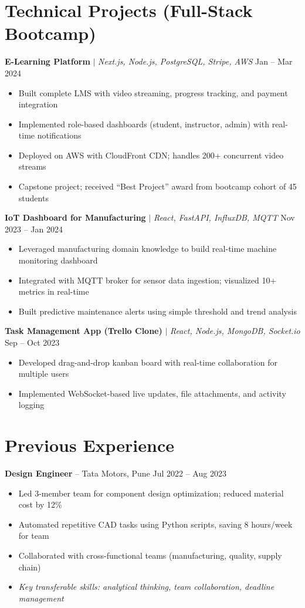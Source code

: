 \documentclass[10.5pt,a4paper]{article}
\begin{document}
\section{Technical Projects (Full-Stack Bootcamp)}
\textbf{\color{accent}E-Learning Platform} $\mid$ \textit{Next.js, Node.js, PostgreSQL, Stripe, AWS} \hfill Jan -- Mar 2024
\begin{itemize}
    \item Built complete LMS with video streaming, progress tracking, and payment integration
    \item Implemented role-based dashboards (student, instructor, admin) with real-time notifications
    \item Deployed on AWS with CloudFront CDN; handles 200+ concurrent video streams
    \item Capstone project; received ``Best Project'' award from bootcamp cohort of 45 students
\end{itemize}

\vspace{4pt}
\textbf{\color{accent}IoT Dashboard for Manufacturing} $\mid$ \textit{React, FastAPI, InfluxDB, MQTT} \hfill Nov 2023 -- Jan 2024
\begin{itemize}
    \item Leveraged manufacturing domain knowledge to build real-time machine monitoring dashboard
    \item Integrated with MQTT broker for sensor data ingestion; visualized 10+ metrics in real-time
    \item Built predictive maintenance alerts using simple threshold and trend analysis
\end{itemize}

\vspace{4pt}
\textbf{\color{accent}Task Management App (Trello Clone)} $\mid$ \textit{React, Node.js, MongoDB, Socket.io} \hfill Sep -- Oct 2023
\begin{itemize}
    \item Developed drag-and-drop kanban board with real-time collaboration for multiple users
    \item Implemented WebSocket-based live updates, file attachments, and activity logging
\end{itemize}

\section{Previous Experience}
\textbf{Design Engineer} -- Tata Motors, Pune \hfill Jul 2022 -- Aug 2023
\begin{itemize}
    \item Led 3-member team for component design optimization; reduced material cost by 12\%
    \item Automated repetitive CAD tasks using Python scripts, saving 8 hours/week for team
    \item Collaborated with cross-functional teams (manufacturing, quality, supply chain)
    \item \textit{\color{accent}Key transferable skills: analytical thinking, team collaboration, deadline management}
\end{itemize}
\end{document}
